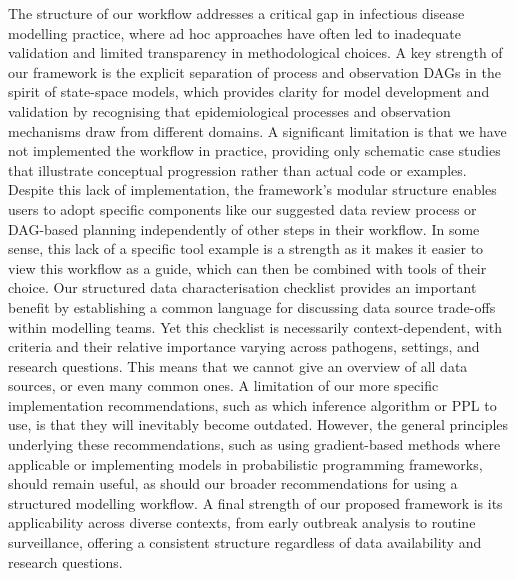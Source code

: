 \documentclass{article}
\begin{document}
The structure of our workflow addresses a critical gap in infectious disease modelling practice, where ad hoc approaches have often led to inadequate validation and limited transparency in methodological choices.
A key strength of our framework is the explicit separation of process and observation \ac{DAG}s in the spirit of state-space models, which provides clarity for model development and validation by recognising that epidemiological processes and observation mechanisms draw from different domains.
A significant limitation is that we have not implemented the workflow in practice, providing only schematic case studies that illustrate conceptual progression rather than actual code or examples.
Despite this lack of implementation, the framework's modular structure enables users to adopt specific components like our suggested data review process or DAG-based planning independently of other steps in their workflow.
In some sense, this lack of a specific tool example is a strength as it makes it easier to view this workflow as a guide, which can then be combined with tools of their choice.
Our structured data characterisation checklist provides an important benefit by establishing a common language for discussing data source trade-offs within modelling teams.
Yet this checklist is necessarily context-dependent, with criteria and their relative importance varying across pathogens, settings, and research questions.
This means that we cannot give an overview of all data sources, or even many common ones.
A limitation of our more specific implementation recommendations, such as which inference algorithm or \ac{PPL} to use, is that they will inevitably become outdated. However, the general principles underlying these recommendations, such as using gradient-based methods where applicable or implementing models in probabilistic programming frameworks, should remain useful, as should our broader recommendations for using a structured modelling workflow.
A final strength of our proposed framework is its applicability across diverse contexts, from early outbreak analysis to routine surveillance, offering a consistent structure regardless of data availability and research questions.


\end{document}
